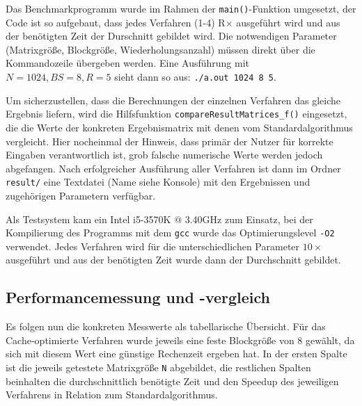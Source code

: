 \documentclass[a4paper,11pt]{scrartcl}
\begin{document}
Das Benchmarkprogramm wurde im Rahmen der \texttt{main()}-Funktion umgesetzt,
der Code ist so aufgebaut, dass jedes Verfahren (1-4) R$\times$ ausgeführt wird
und aus der benötigten Zeit der Durschnitt gebildet wird. Die notwendigen Parameter
(Matrixgröße, Blockgröße, Wiederholungsanzahl) müssen direkt über die Kommandozeile übergeben werden.
Eine Ausführung mit $N = 1024, BS = 8, R = 5$ sieht dann so aus: \texttt{./a.out 1024 8 5}.
\newline

Um sicherzustellen, dass die Berechnungen der einzelnen Verfahren das gleiche Ergebnis
liefern, wird die Hilfsfunktion \texttt{compareResultMatrices\_f()} eingesetzt, die
die Werte der konkreten Ergebnismatrix mit denen vom Standardalgorithmus vergleicht.
Hier nocheinmal der Hinweis, dass primär der Nutzer für korrekte Eingaben verantwortlich ist, 
grob falsche numerische Werte werden jedoch abgefangen.
Nach erfolgreicher Ausführung aller Verfahren ist dann im Ordner \texttt{result/} eine Textdatei (Name
siehe Konsole) mit den Ergebnissen und zugehörigen Parametern verfügbar. \newline

Als Testsystem kam ein Intel i5-3570K $@$ 3.40GHz zum Einsatz, bei der
Kompilierung des Programms mit dem \texttt{gcc} wurde das Optimierungslevel \texttt{-O2} verwendet.
Jedes Verfahren wird für die unterschiedlichen
Parameter $10 \times$ ausgeführt und aus der benötigten Zeit wurde dann der
Durchschnitt gebildet.


\subsection{Performancemessung und -vergleich}\label{chp:Bench1}
Es folgen nun die konkreten Messwerte als tabellarische Übersicht.
Für das Cache-optimierte Verfahren wurde jeweils eine feste Blockgröße von $8$ gewählt,
da sich mit diesem Wert eine günstige Rechenzeit ergeben hat.
In der ersten Spalte ist die jeweils getestete Matrixgröße \texttt{N} abgebildet, 
die restlichen Spalten beinhalten die durchschnittlich benötigte Zeit und den Speedup des jeweiligen
Verfahrens in Relation zum Standardalgorithmus.\newline

\end{document}
